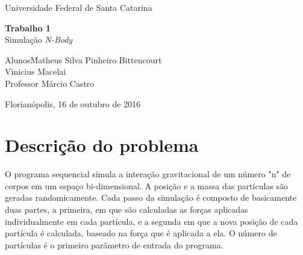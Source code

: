 \documentclass[a4paper, 12pt]{article}
\begin{document}
\begin{titlepage}
    \begin{center}
        \huge{Universidade Federal de Santa Catarina}

\vspace{10pt}

        \vspace{85pt}

        \textbf{\LARGE{Trabalho 1}}
        \large{\\Simulação \textit{N-Body}}
        \vspace{160pt}

    \end{center}

    \begin{flushleft}
        \begin{tabbing}
            Alunos\qquad\qquad\=
            Matheus Silva Pinheiro Bittencourt\\
            \>Vinicius Macelai\\
            Professor\> Márcio Castro \\
        \end{tabbing}
    \end{flushleft}

    \begin{center}
        \vspace{\fill}
        Florianópolis, 16 de outubro de 2016
    \end{center}
\end{titlepage}


\newpage
\tableofcontents
\thispagestyle{empty}


\newpage
{}

\section{Descrição do problema}

O programa sequencial simula a interação gravitacional de um número "n" de
corpos em um espaço bi-dimensional. A posição e a massa das partículas são
geradas randomicamente. Cada passo da simulação é composto de basicamente duas
partes, a primeira, em que são calculadas as forças aplicadas individualmente em
cada partícula, e a segunda em que a nova posição de cada partícula é calculada,
baseado na força que é aplicada a ela. O número de partículas é o primeiro
parâmetro de entrada do programa.
\end{document}
